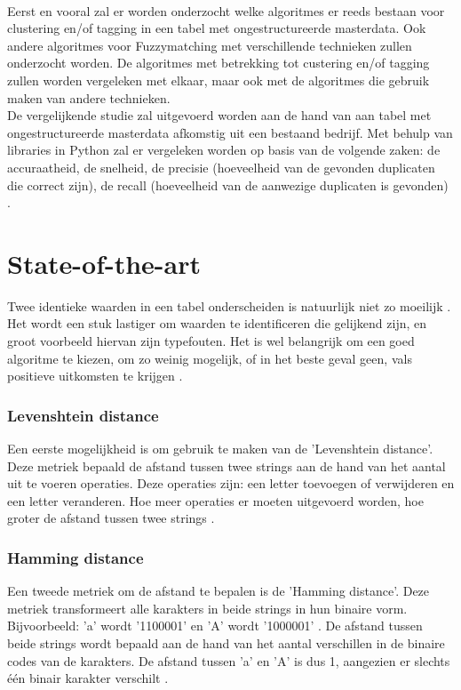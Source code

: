 \\\indent
Eerst en vooral zal er worden onderzocht welke algoritmes er reeds bestaan voor clustering en/of tagging in een tabel met ongestructureerde masterdata. Ook andere algoritmes voor Fuzzymatching met verschillende technieken zullen onderzocht worden. De algoritmes met betrekking tot custering en/of tagging zullen worden vergeleken met elkaar, maar ook met de algoritmes die gebruik maken van andere technieken.
\\\indent
De vergelijkende studie zal uitgevoerd worden aan de hand van aan tabel met ongestructureerde masterdata afkomstig uit een bestaand bedrijf. Met behulp van libraries in Python zal er vergeleken worden op basis van de volgende zaken: de accuraatheid, de snelheid, de precisie (hoeveelheid van de gevonden duplicaten die correct zijn), de recall (hoeveelheid van de aanwezige duplicaten is gevonden) \autocite{GoogleDevelopers2022}.


\section{State-of-the-art}%
\label{sec:state-of-the-art}

Twee identieke waarden in een tabel onderscheiden is natuurlijk niet zo moeilijk \autocite{Lievens2022}. Het wordt een stuk lastiger om waarden te identificeren die gelijkend zijn, en groot voorbeeld hiervan zijn typefouten. Het is wel belangrijk om een goed algoritme te kiezen, om zo weinig mogelijk, of in het beste geval geen, vals positieve uitkomsten te krijgen \autocite{Silva2022}.
\subsubsection{Levenshtein distance}
Een eerste mogelijkheid is om gebruik te maken van de 'Levenshtein distance'. Deze metriek bepaald de afstand tussen twee strings aan de hand van het aantal uit te voeren operaties. Deze operaties zijn: een letter toevoegen of verwijderen en een letter veranderen. Hoe meer operaties er moeten uitgevoerd worden, hoe groter de afstand tussen twee strings \autocite{Wikiversity2022}.
\subsubsection{Hamming distance}
Een tweede metriek om de afstand te bepalen is de 'Hamming distance'. Deze metriek transformeert alle karakters in beide strings in hun binaire vorm. Bijvoorbeeld: 'a' wordt '1100001' en 'A' wordt '1000001' \autocite{Includehelp}. De afstand tussen beide strings wordt bepaald aan de hand van het aantal verschillen in de binaire codes van de karakters. De afstand tussen 'a' en 'A' is dus 1, aangezien er slechts één binair karakter verschilt \autocite{Silva2022}.
